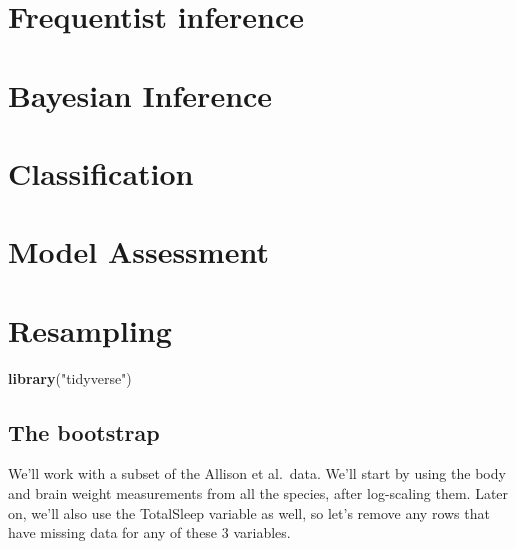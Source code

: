 \documentclass[
]{book}
\newenvironment{Shaded}{\begin{snugshade}}{\end{snugshade}}
\newcommand{\KeywordTok}[1]{\textcolor[rgb]{0.13,0.29,0.53}{\textbf{#1}}}
\newcommand{\NormalTok}[1]{#1}
\newcommand{\StringTok}[1]{\textcolor[rgb]{0.31,0.60,0.02}{#1}}
\begin{document}
\hypertarget{frequentist-inference}{%
\chapter{Frequentist inference}\label{frequentist-inference}}

\hypertarget{bayesian-inference}{%
\chapter{Bayesian Inference}\label{bayesian-inference}}

\hypertarget{classification}{%
\chapter{Classification}\label{classification}}

\hypertarget{model-assessment}{%
\chapter{Model Assessment}\label{model-assessment}}

\hypertarget{resampling}{%
\chapter{Resampling}\label{resampling}}

\begin{Shaded}
\begin{Highlighting}[]
\KeywordTok{library}\NormalTok{(}\StringTok{"tidyverse"}\NormalTok{)}
\end{Highlighting}
\end{Shaded}

\hypertarget{the-bootstrap}{%
\section{The bootstrap}\label{the-bootstrap}}

We'll work with a subset of the Allison et al.~data. We'll start by using the body and brain weight measurements from all the species, after log-scaling them. Later on, we'll also use the TotalSleep variable as well, so let's remove any rows that have missing data for any of these 3 variables.
\end{document}
